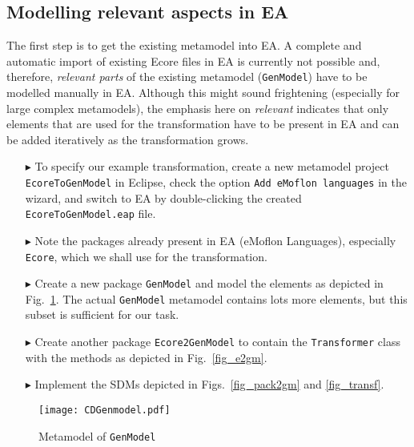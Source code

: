 \subsection{Modelling relevant aspects in EA}
\visHeader

The first step is to get the existing metamodel into EA. A complete and automatic import of existing Ecore files in EA is currently not possible and, therefore,
\emph{relevant parts} of the existing metamodel (\texttt{GenModel}) have to be modelled manually in EA. Although this might sound frightening (especially for
large complex metamodels), the emphasis here on \emph{relevant} indicates that only elements that are used for the transformation have to be present in EA and
can be added iteratively as the transformation grows.

\begin{enumerate}
\item[$\blacktriangleright$] To specify our example transformation, create a new metamodel project \texttt{EcoreToGenModel} in Eclipse, check the option
\texttt{Add eMoflon languages} in the wizard, and switch to EA by double-clicking the created \texttt{Ecore\-To\-Gen\-Model.eap} file.

\item[$\blacktriangleright$] Note the packages already present in EA (eMoflon Languages), especially \texttt{Ecore}, which we shall use for the transformation.

\item[$\blacktriangleright$] Create a new package \texttt{GenModel} and model the elements as depicted in Fig.~\ref{fig_gMM}.
The actual \texttt{GenModel} metamodel contains lots more elements, but this subset is sufficient for our task.

\item[$\blacktriangleright$] Create another package \texttt{Ecore2GenModel} to contain the \texttt{Transformer} class with the methods as depicted in
Fig.~\ref{fig_e2gm}.

\item[$\blacktriangleright$] Implement the SDMs depicted in Figs.~\ref{fig_pack2gm} and \ref{fig_transf}.
\end{enumerate}

\begin{figure}[htbp]
\begin{center}  
	\texttt{[image: CDGenmodel.pdf]}
	\caption{Metamodel of \texttt{GenModel}}  
\label{fig_gMM}
\end{center}
\end{figure} 


